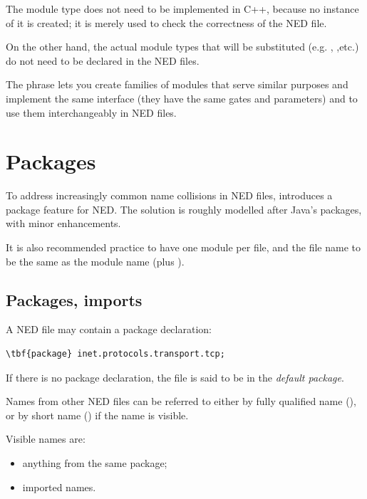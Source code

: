 The  module type does not need to be implemented in
C++, because no instance of it is created; it is merely used
to check the correctness of the NED file.

On the other hand, the actual module types that will be substituted
(e.g. , ,etc.)
do not need to be declared in the NED files.

The  phrase lets you create families
of modules that serve similar purposes and implement the same interface
(they have the same gates and parameters)
and to use them interchangeably in NED files.



\section{Packages}

To address increasingly common name collisions in NED files,
 introduces a package feature for NED. The solution
is roughly modelled after Java's packages, with minor enhancements.

It is also recommended practice to have one module per file,
and the file name to be the same as the module name (plus ).

\subsection{Packages, imports}

A NED file may contain a package declaration:

\begin{Verbatim}[commandchars=\\\{\}]
\tbf{package} inet.protocols.transport.tcp;
\end{Verbatim}

If there is no package declaration, the file is said to be in the
\textit{default package}.

Names from other NED files can be referred to either by fully qualified
name (), or by short name
() if the name is visible.

Visible names are:
\begin{itemize}
  \item anything from the same package;
  \item imported names.
\end{itemize}

